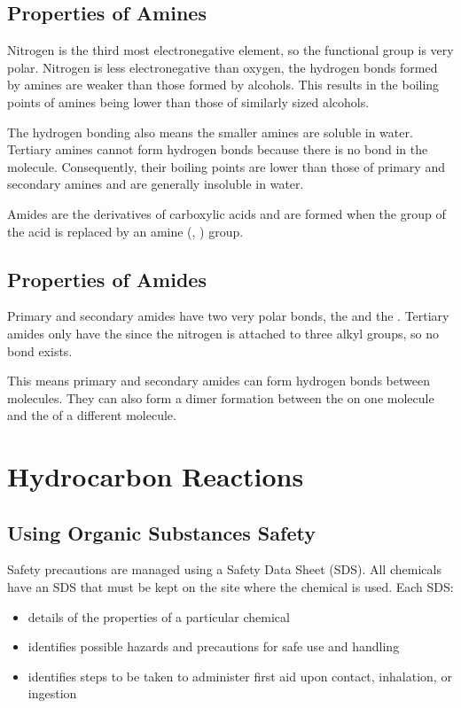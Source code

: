 	\subsection{Properties of Amines}
	
		Nitrogen is the third most electronegative element, so the  functional group is very polar. Nitrogen is less electronegative than oxygen, the hydrogen bonds formed by amines are weaker than those formed by alcohols. This results in the boiling points of amines being lower than those of similarly sized alcohols.

		The hydrogen bonding also means the smaller amines are soluble in water. Tertiary amines cannot form hydrogen bonds because there is no  bond in the molecule. Consequently, their boiling points are lower than those of primary and secondary amines and are generally insoluble in water.

	
		Amides are the derivatives of carboxylic acids and are formed when the  group of the acid is replaced by an amine (, ) group.

	\subsection{Properties of Amides}
		
	Primary and secondary amides have two very polar bonds, the  and the . Tertiary amides only have the  since the nitrogen is attached to three alkyl groups, so no  bond exists.

	This means primary and secondary amides can form hydrogen bonds between molecules. They can also form a dimer formation between the  on one molecule and the  of a different molecule.

\section{Hydrocarbon Reactions}

	\subsection{Using Organic Substances Safety}
	
		Safety precautions are managed using a Safety Data Sheet (SDS). All chemicals have an SDS that must be kept on the site where the chemical is used. Each SDS:

		\begin{itemize}
			\item details of the properties of a particular chemical
			\item identifies possible hazards and precautions for safe use and handling
			\item identifies steps to be taken to administer first aid upon contact, inhalation, or ingestion
		\end{itemize}

